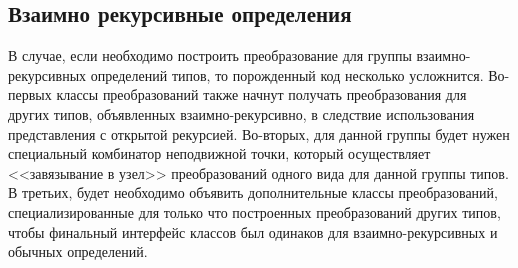 %
%
%
%
%



\subsection{Взаимно рекурсивные определения}
\label{murec}

В случае, если необходимо построить преобразование для группы взаимно-рекурсивных определений типов, то порожденный код несколько усложнится. Во-первых классы преобразований также начнут получать преобразования для других типов, объявленных взаимно-рекурсивно, в следствие использования представления с открытой рекурсией. Во-вторых, для данной группы будет нужен специальный комбинатор неподвижной точки, который осуществляет <<завязывание в узел>> преобразований одного вида для данной группы типов. В третьих, будет необходимо объявить дополнительные классы преобразований, специализированные для только что построенных преобразований других типов, чтобы финальный интерфейс классов был одинаков для взаимно-рекурсивных и обычных определений.



